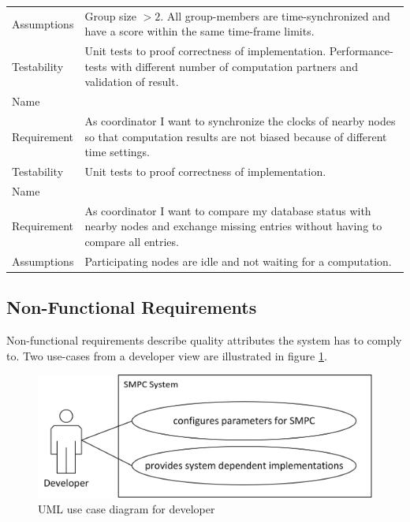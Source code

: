 \begin{table}[!htb]
\begin{tabular}{|l|p{}|}
			Assumptions & Group size $>2$. All group-members are time-synchronized and have a score within the same time-frame limits. \\
			Testability & Unit tests to proof correctness of implementation. Performance-tests with different number of computation partners and validation of result. \\ \midrule
			Name & \funcreq{Clock Synchronization}\label{req:Clock Synchronization} \\ \midrule
			Requirement & As coordinator I want to synchronize the clocks of nearby nodes so that computation results are not biased because of different time settings. \\
			Testability & Unit tests to proof correctness of implementation. \\ \midrule
			Name & \funcreq{Database Synchronization}\label{req:Database Synchronization} \\ \midrule
			Requirement & As coordinator I want to compare my database status with nearby nodes and exchange missing entries without having to compare all entries. \\
			Assumptions & Participating nodes are idle and not waiting for a computation.\\
			\bottomrule
		\end{tabular}
	\end{table}

	\FloatBarrier
	\subsection{Non-Functional Requirements} \label{Non-Functional Requirements}

	Non-functional requirements describe quality attributes the system has to comply to. Two use-cases from a developer view are illustrated in figure \ref{figure:requirements use case developer}.

	\begin{figure}[!htb] %
	\caption{\gls{UML} use case diagram for developer} \label{figure:requirements use case developer}
	\includegraphics[scale=0.85]{figures/use-case-developer.png}
	\end{figure}

